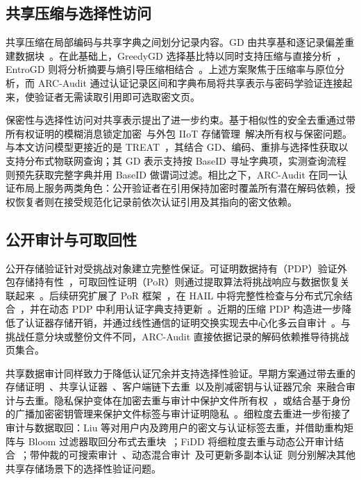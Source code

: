 \documentclass[10pt,journal]{IEEEtran}
\begin{document}
\subsection{共享压缩与选择性访问}
共享压缩在局部编码与共享字典之间划分记录内容。GD 由共享基和逐记录偏差重建数据块~\cite{Talasila2019}。在此基础上，GreedyGD 选择基比特以同时支持压缩与直接分析~\cite{Hurst2024GreedyGD}，EntroGD 则将分析摘要与熵引导压缩相结合~\cite{Zhao2026EntroGD}。上述方案聚焦于压缩率与原位分析，而 ARC-Audit 通过认证记录区间和字典布局将共享表示与密码学验证连接起来，使验证者无需读取引用即可选取密文页。

保密性与选择性访问对共享表示提出了进一步约束。基于相似性的安全去重通过带所有权证明的模糊消息锁定加密~\cite{Jiang2023FuzzyDedup}与外包 IIoT 存储管理~\cite{Gao2024}解决所有权与保密问题。与本文访问模型更接近的是 TREAT~\cite{Taurone2024TREAT}，其结合 GD、编码、重排与选择性获取以支持分布式物联网查询；其 GD 表示支持按 BaseID 寻址字典项，实测查询流程则预先获取完整字典并用 BaseID 做谓词过滤。相比之下，ARC-Audit 在同一认证布局上服务两类角色：公开验证者在引用保持加密时覆盖所有潜在解码依赖，授权恢复者则在接受规范化记录前依次认证引用及其指向的密文依赖。

\subsection{公开审计与可取回性}
公开存储验证针对受挑战对象建立完整性保证。可证明数据持有（PDP）验证外包存储持有性~\cite{Ateniese2007PDP}，可取回性证明（PoR）则通过提取算法将挑战响应与数据恢复关联起来~\cite{Juels2007POR,ShachamWaters2013}。后续研究扩展了 PoR 框架~\cite{Bowers2009PORTheory}，在 HAIL 中将完整性检查与分布式冗余结合~\cite{Bowers2009HAIL}，并在动态 PDP 中利用认证字典支持更新~\cite{Erway2009DPDP}。近期的压缩 PDP 构造进一步降低了认证器存储开销，并通过线性通信的证明交换实现去中心化多云自审计~\cite{Yang2025CompressedPDP}。与挑战任意分块或整份文件不同，ARC-Audit 直接依据记录的解码依赖推导待挑战页集合。

共享数据审计同样致力于降低认证冗余并支持选择性验证。早期方案通过带去重的存储证明~\cite{Zheng2012POSD}、共享认证器~\cite{Tian2022SharedAudit}、客户端链下去重~\cite{Zhang2023BlockchainAudit}以及削减密钥与认证器冗余~\cite{Miao2024SharedAudit}来融合审计与去重。隐私保护变体在加密去重与审计中保护文件所有权~\cite{Song2023EncryptedAudit}，或结合基于身份的广播加密密钥管理来保护文件标签与审计证明隐私~\cite{Zhang2025PrivacyAudit}。细粒度去重进一步衔接了审计与数据取回：Liu 等对用户内及跨用户的密文与认证标签去重，并借助重构矩阵与 Bloom 过滤器取回分布式去重块~\cite{Liu2025FineGrained}；FiDD 将细粒度去重与动态公开审计结合~\cite{Huang2026FiDD}；带仲裁的可搜索审计~\cite{Miao2025}、动态混合审计~\cite{Pan2026}及可更新多副本认证~\cite{Xu2026MPA}则分别解决其他共享存储场景下的选择性验证问题。
\end{document}
